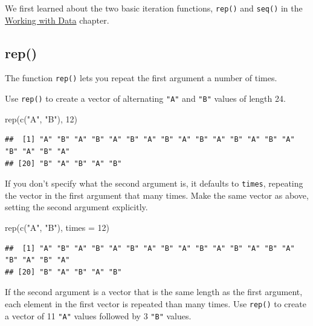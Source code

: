 \documentclass[
  oneside]{book}
\newenvironment{Shaded}{\begin{snugshade}}{\end{snugshade}}
\newcommand{\AttributeTok}[1]{\textcolor[rgb]{0.77,0.63,0.00}{#1}}
\newcommand{\DecValTok}[1]{\textcolor[rgb]{0.00,0.00,0.81}{#1}}
\newcommand{\FunctionTok}[1]{\textcolor[rgb]{0.00,0.00,0.00}{#1}}
\newcommand{\NormalTok}[1]{#1}
\newcommand{\StringTok}[1]{\textcolor[rgb]{0.31,0.60,0.02}{#1}}
\begin{document}
We first learned about the two basic iteration functions, \texttt{rep()} and \texttt{seq()} in the \protect\hyperlink{rep_seq}{Working with Data} chapter.

\hypertarget{rep}{%
\subsection{rep()}\label{rep}}

The function \texttt{rep()} lets you repeat the first argument a number of times.

Use \texttt{rep()} to create a vector of alternating \texttt{"A"} and \texttt{"B"} values of length 24.

\begin{Shaded}
\begin{Highlighting}[]
\FunctionTok{rep}\NormalTok{(}\FunctionTok{c}\NormalTok{(}\StringTok{"A"}\NormalTok{, }\StringTok{"B"}\NormalTok{), }\DecValTok{12}\NormalTok{)}
\end{Highlighting}
\end{Shaded}

\begin{verbatim}
##  [1] "A" "B" "A" "B" "A" "B" "A" "B" "A" "B" "A" "B" "A" "B" "A" "B" "A" "B" "A"
## [20] "B" "A" "B" "A" "B"
\end{verbatim}

If you don't specify what the second argument is, it defaults to \texttt{times}, repeating the vector in the first argument that many times. Make the same vector as above, setting the second argument explicitly.

\begin{Shaded}
\begin{Highlighting}[]
\FunctionTok{rep}\NormalTok{(}\FunctionTok{c}\NormalTok{(}\StringTok{"A"}\NormalTok{, }\StringTok{"B"}\NormalTok{), }\AttributeTok{times =} \DecValTok{12}\NormalTok{)}
\end{Highlighting}
\end{Shaded}

\begin{verbatim}
##  [1] "A" "B" "A" "B" "A" "B" "A" "B" "A" "B" "A" "B" "A" "B" "A" "B" "A" "B" "A"
## [20] "B" "A" "B" "A" "B"
\end{verbatim}

If the second argument is a vector that is the same length as the first argument, each element in the first vector is repeated than many times. Use \texttt{rep()} to create a vector of 11 \texttt{"A"} values followed by 3 \texttt{"B"} values.
\end{document}
